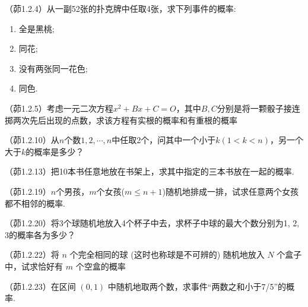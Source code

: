\begin{problemset}[错题记录]
    \item （茆1.2.4）从一副52张的扑克牌中任取4张，求下列事件的概率:
    \begin{enumerate}
        \item 全是黑桃;
        \item 同花;
        \item 没有两张同一花色;
        \item 同色.
    \end{enumerate}
    \item （茆1.2.5）考虑一元二次方程$x^2+Bx+C=O$，其中$B,C$分别是将一颗骰子接连掷两次先后出现的点数，求该方程有实根的概率和有重根的概率
    \item （茆1.2.10）从$n$个数$1, 2, \cdots, n$中任取2个，问其中一个小于$k (1 < k < n)$，另一个大于$k$的概率是多少？
    \item （茆1.2.13）把10本书任意地放在书架上，求其中指定的三本书放在一起的概率.
    \item （茆1.2.19）$n$个男孩，$m$个女孩($m \le n + 1$)随机地排成一排，试求任意两个女孩都不相邻的概率.
    \item （茆1.2.20）将3个球随机地放入4个杯子中去，求杯子中球的最大个数分别为1, 2, 3的概率各为多少？
    \item （茆1.2.22）将 $n$ 个完全相同的球 (这时也称球是不可辨的) 随机地放入 $N$ 个盒子中，试求恰好有 $m$ 个空盒的概率
    \item （茆1.2.23）在区间 $(0,1)$ 中随机地取两个数，求事件“两数之和小于7/5”的概率.
    \item
\end{problemset}
